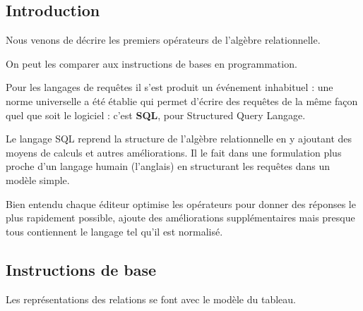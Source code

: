 \subsection{Introduction}
Nous venons de décrire les premiers opérateurs de l'algèbre relationnelle. 

On peut les comparer aux instructions de bases en programmation. 

Pour les langages de requêtes il s'est produit un événement inhabituel : une norme universelle a été établie qui permet d'écrire des requêtes de la même façon quel que soit le logiciel : c'est {\bf SQL}, pour {\sc Structured Query Langage}.

Le langage SQL reprend la structure de l'algèbre relationnelle en y ajoutant des moyens de calculs et autres améliorations. Il le fait dans une formulation plus proche d'un langage humain (l'anglais) en structurant les requêtes dans un modèle simple.

Bien entendu chaque éditeur optimise les opérateurs pour donner des réponses le plus rapidement possible, ajoute des améliorations supplémentaires mais presque tous contiennent le langage tel qu'il est normalisé.

\medskip
\subsection{Instructions de base}
Les représentations des relations se font avec le modèle du tableau.

